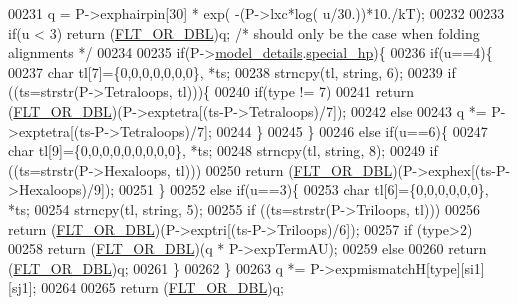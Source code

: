 \begin{DoxyCode}
00231     q = P->exphairpin[30] * exp( -(P->lxc*log( u/30.))*10./kT);
00232 
00233   \textcolor{keywordflow}{if}(u < 3) \textcolor{keywordflow}{return} (\hyperlink{group__data__structures_ga31125aeace516926bf7f251f759b6126}{FLT\_OR\_DBL})q; \textcolor{comment}{/* should only be the case when folding alignments */}
00234 
00235   \textcolor{keywordflow}{if}(P->\hyperlink{group__energy__parameters_ac18055127bccc27c1223f1d2f3b01b53}{model\_details}.\hyperlink{structvrna__md__s_add64a96d23e77ef1d0ddf8dfc5228143}{special\_hp})\{
00236     \textcolor{keywordflow}{if}(u==4)\{
00237       \textcolor{keywordtype}{char} tl[7]=\{0,0,0,0,0,0,0\}, *ts;
00238       strncpy(tl, \textcolor{keywordtype}{string}, 6);
00239       \textcolor{keywordflow}{if} ((ts=strstr(P->Tetraloops, tl)))\{
00240         \textcolor{keywordflow}{if}(type != 7)
00241           \textcolor{keywordflow}{return} (\hyperlink{group__data__structures_ga31125aeace516926bf7f251f759b6126}{FLT\_OR\_DBL})(P->exptetra[(ts-P->Tetraloops)/7]);
00242         \textcolor{keywordflow}{else}
00243           q *= P->exptetra[(ts-P->Tetraloops)/7];
00244       \}
00245     \}
00246     \textcolor{keywordflow}{else} \textcolor{keywordflow}{if}(u==6)\{
00247       \textcolor{keywordtype}{char} tl[9]=\{0,0,0,0,0,0,0,0,0\}, *ts;
00248       strncpy(tl, \textcolor{keywordtype}{string}, 8);
00249       \textcolor{keywordflow}{if} ((ts=strstr(P->Hexaloops, tl)))
00250         \textcolor{keywordflow}{return}  (\hyperlink{group__data__structures_ga31125aeace516926bf7f251f759b6126}{FLT\_OR\_DBL})(P->exphex[(ts-P->Hexaloops)/9]);
00251     \}
00252     \textcolor{keywordflow}{else} \textcolor{keywordflow}{if}(u==3)\{
00253       \textcolor{keywordtype}{char} tl[6]=\{0,0,0,0,0,0\}, *ts;
00254       strncpy(tl, \textcolor{keywordtype}{string}, 5);
00255       \textcolor{keywordflow}{if} ((ts=strstr(P->Triloops, tl)))
00256         \textcolor{keywordflow}{return} (\hyperlink{group__data__structures_ga31125aeace516926bf7f251f759b6126}{FLT\_OR\_DBL})(P->exptri[(ts-P->Triloops)/6]);
00257       \textcolor{keywordflow}{if} (type>2)
00258         \textcolor{keywordflow}{return} (\hyperlink{group__data__structures_ga31125aeace516926bf7f251f759b6126}{FLT\_OR\_DBL})(q * P->expTermAU);
00259       \textcolor{keywordflow}{else}
00260         \textcolor{keywordflow}{return} (\hyperlink{group__data__structures_ga31125aeace516926bf7f251f759b6126}{FLT\_OR\_DBL})q;
00261     \}
00262   \}
00263   q *= P->expmismatchH[type][si1][sj1];
00264 
00265   \textcolor{keywordflow}{return} (\hyperlink{group__data__structures_ga31125aeace516926bf7f251f759b6126}{FLT\_OR\_DBL})q;

\end{DoxyCode}
